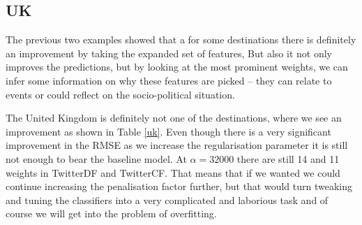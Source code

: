 \documentclass[minf,twoside,singlespacing,parskip,frontabs,notimes,11pt]{infthesis}
\begin{document}
\newpage
\subsection{UK}

The previous two examples showed that a for some destinations there is definitely an improvement by taking the expanded set of features, But also it not only improves the predictions, but by looking at the most prominent weights, we can infer some information on why these features are picked -- they can relate to events or could reflect on the socio-political situation. 

The United Kingdom is definitely not one of the destinations, where we see an improvement as shown in Table \ref{uk}.  Even though there is a very significant improvement in the RMSE as we increase the regularisation parameter it is still not enough to bear the baseline model. At $\alpha=32000$ there are still 14 and 11 weights in TwitterDF and TwitterCF. That means that if we wanted we could continue increasing the penalisation factor further, but that would turn tweaking and tuning the classifiers into a very complicated and laborious task and of course we will get into the problem of overfitting.
\end{document}

